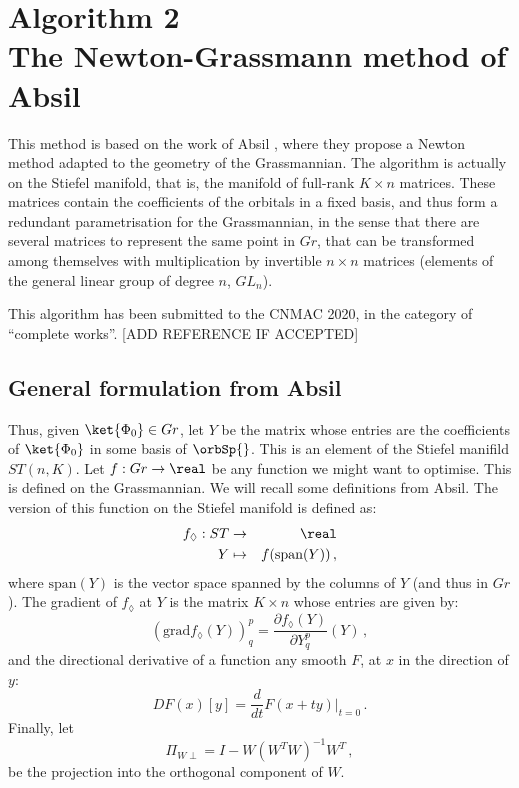 \documentclass[a4paper,11pt]{article}
\begin{document}
\newpage
\section{\textsf{\LARGE Algorithm 2}\\The Newton-Grassmann method of Absil}

This method is based on the work of Absil \etal{}, where they propose a Newton method adapted to the geometry of the Grassmannian.
The algorithm is actually on the Stiefel manifold, that is, the manifold of full-rank $K \times n$ matrices.
These matrices contain the coefficients of the orbitals in a fixed basis, and thus form a redundant parametrisation for the Grassmannian, in the sense that there are several matrices to represent the same point in $Gr$, that can be transformed among themselves with multiplication by invertible $n \times n$ matrices (elements of the general linear group of degree $n$, $GL_n$).

This algorithm has been submitted to the CNMAC 2020, in the category of ``complete works''. [ADD REFERENCE IF ACCEPTED]

\subsection{General formulation from Absil}

Thus, given $\ket{\Phi_0} \in Gr$, let $Y$ be the matrix whose entries are the coefficients of $\ket{\Phi_0}$ in some basis of $\orbSp{}$.
This is an element of the Stiefel manifild $ST(n,K)$.
Let $f : Gr \to \real$ be any function we might want to optimise.
This is defined on the Grassmannian.
We will recall some definitions from Absil.\cite{}
The version of this function on the Stiefel manifold is defined as:
\begin{eqnarray}
  f_{\lozenge} : ST &\to& \real\\
  Y &\mapsto& f(\text{span}(Y))\,,
\end{eqnarray}
where $\text{span}(Y)$ is the vector space spanned by the columns of $Y$ (and thus in $Gr$).
The gradient of $f_\lozenge$ at $Y$ is the matrix $K \times n$ whose entries are given by:
\begin{equation}
(\text{grad} f_\lozenge(Y))^p_q = \frac{\partial f_\lozenge(Y)}{\partial Y^p_q}(Y)\,,
\end{equation}
and the directional derivative of a function any smooth $F$, at $x$ in the direction of $y$:
\begin{equation}
  DF(x)[y] = \frac{d}{dt}F(x + ty)\big|_{t=0}\,.
\end{equation}
Finally, let
\begin{equation}
  \Pi_{W\perp} = I - W(W^TW)^{-1}W^T\,,
\end{equation}
be the projection into the orthogonal component of $W$.
\end{document}
